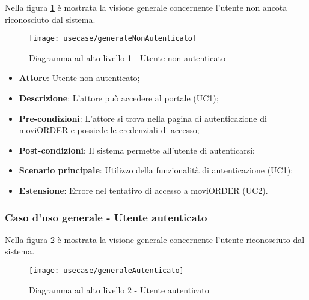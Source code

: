 Nella figura \ref{fig:altoLivello1} è mostrata la visione generale concernente l'utente non ancota riconosciuto dal sistema.

\begin{figure}[!h] 
    \centering 
    \texttt{[image: usecase/generaleNonAutenticato]} 
    \caption{Diagramma ad alto livello 1 - Utente non autenticato}
    \label{fig:altoLivello1}
\end{figure}

\begin{itemize}
	\item \textbf{Attore}: Utente non autenticato;
	\item \textbf{Descrizione}: L'attore può accedere al portale (UC1);
	\item \textbf{Pre-condizioni}: L'attore si trova nella pagina di autenticazione di moviORDER e possiede le credenziali di accesso;
	\item \textbf{Post-condizioni}: Il sistema permette all'utente di autenticarsi;
	\item \textbf{Scenario principale}: Utilizzo della funzionalità di autenticazione (UC1);
	\item \textbf{Estensione}: Errore nel tentativo di accesso a moviORDER (UC2).
\end{itemize}

\newpage

\subsubsection{Caso d'uso generale - Utente autenticato}

Nella figura \ref{fig:altoLivello2} è mostrata la visione generale concernente l'utente riconosciuto dal sistema.

\begin{figure}[!h] 
    \centering 
    \texttt{[image: usecase/generaleAutenticato]} 
    \caption{Diagramma ad alto livello 2 - Utente autenticato}
    \label{fig:altoLivello2}
\end{figure}

